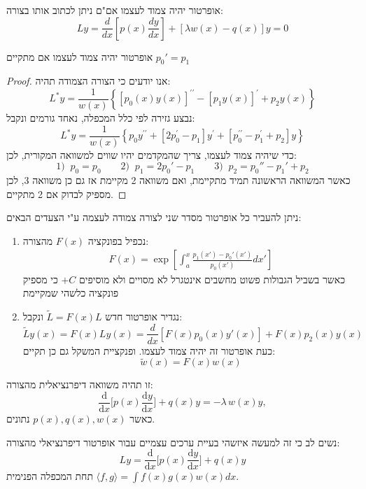 \documentclass{tstextbook}
\begin{document}
\begin{proposition}
אופרטור יהיה צמוד לעצמו אם"ם ניתן לכתוב אותו בצורה:
$$Ly= \frac d{dx}\left[p\left(x\right)\frac{dy}{dx}\right]+\left[\lambda w\left(x\right)-q\left(x\right)\right]y=0$$

\end{proposition}
\begin{proposition}
אופרטור יהיה צמוד לעצמו אם מתקיים \(p_{0}'=p_{1}\)

\end{proposition}
\begin{proof}
אנו יודעים כי הצורה הצמודה תהיה:
$$L^{*}y=\frac{1}{w(x)}\left\{\left[p_{0}(x)y(x)\right]^{\prime\prime}-\left[p_{1}y(x)\right]^{\prime}+p_{2}y(x)\right\}$$
נבצע גזירה לפי כלל המכפלה, נאחד גורמים ונקבל:
$$L^{\ast}y=\frac{1}{w(x)}\left\{p_{0}y^{\prime\prime}+\left[2p_{0}^{\prime}-p_{1}\right]y^{\prime}+\left[p_{0}^{\prime\prime}-p_{1}^{\prime}+p_{2}\right]y\right\}$$
כדי שיהיה צמוד לעצמו, צריך שהמקדמים יהיו שווים למשוואה המקורית, לכן:
$$1)\;\;p_{0}=p_{0}\qquad 2)\;\;p_{1}=2p_{0}'-p_{1}\qquad 3)\;\;p_{2}=p_{0}''-p_{1}'+p_{2}$$
כאשר המשוואה הראשונה תמיד מתקיימת, ואם משוואה 2 מקיימת אז גם כן משוואה 3, לכן מספיק לבדוק אם 2 מתקיים.

\end{proof}
\begin{proposition}
ניתן להעביר כל אופרטור מסדר שני לצורה צמודה לעצמה ע"י הצעדים הבאים:

  \begin{enumerate}
    \item נכפיל בפונקציה \(F(x)\) מהצורה: 
$$ \begin{aligned}F(x)=\exp\left[\int_a^x\frac{p_1(x')-p_0'(x')}{p_0(x')}dx'\right]\end{aligned}$$
כאשר בשביל הגבולות פשוט מחשבים אינטגרל לא מסויים ולא מוסיפים \(+C\) כי מספיק פונקציה כלשהי שמקיימת


    \item נגדיר אופרטור חדש \(\tilde{L}=F(x)L\) ונקבל: 
$$\tilde Ly(x)=F(x)Ly(x)=\frac{d}{dx}[F(x)p_0(x)y'(x)]+F(x)p_2(x)y(x)$$
כעת אופרטור זה יהיה צמוד לעצמו. ופנקציית המשקל גם כן תקיים:
$$ \tilde{w}(x)=F(x)w(x)$$


  \end{enumerate}
\end{proposition}
\begin{definition}
זו תהיה משוואה דיפרנציאלית מהצורה:
$${\frac{\mathrm{d}}{\mathrm{d}x}}\biggl[p(x){\frac{\mathrm{d}y}{\mathrm{d}x}}\biggr]+q(x)y=-\lambda\,w(x)y,$$
כאשר \(p(x),q(x),w(x)\) נתונים.

\end{definition}
נשים לב כי זה למעשה איזשהי בעיית ערכים עצמיים עבור אופרטור דיפרנציאלי מהצורה:
$$Ly={\frac{\mathrm{d}}{\mathrm{d}x}}\biggl[p(x){\frac{\mathrm{d}y}{\mathrm{d}x}}\biggr]+q(x)y$$
תחת המכפלה הפנימית \(\langle f, g \rangle=\int f(x)g(x)w(x)dx\).
\end{document}
